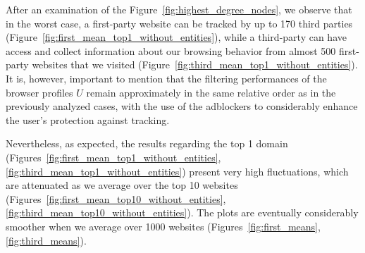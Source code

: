 After an examination of the Figure~\ref{fig:highest_degree_nodes}, we observe that in the worst case, a first-party website can be tracked by up to 170 third parties (Figure~\ref{fig:first_mean_top1_without_entities}), while a third-party can have access and collect information about our browsing behavior from almost 500 first-party websites that we visited (Figure~\ref{fig:third_mean_top1_without_entities}). It is, however, important to mention that the filtering performances of the browser profiles $U$ remain approximately in the same relative order as in the previously analyzed cases, with the use of the adblockers to considerably enhance the user's protection against tracking.

Nevertheless, as expected, the results regarding the top 1 domain (Figures~\ref{fig:first_mean_top1_without_entities}, \ref{fig:third_mean_top1_without_entities}) present very high fluctuations, which are attenuated as we average over the top 10 websites (Figures~\ref{fig:first_mean_top10_without_entities}, \ref{fig:third_mean_top10_without_entities}). The plots are eventually considerably smoother when we average over 1000 websites (Figures~\ref{fig:first_means}, \ref{fig:third_means}).

